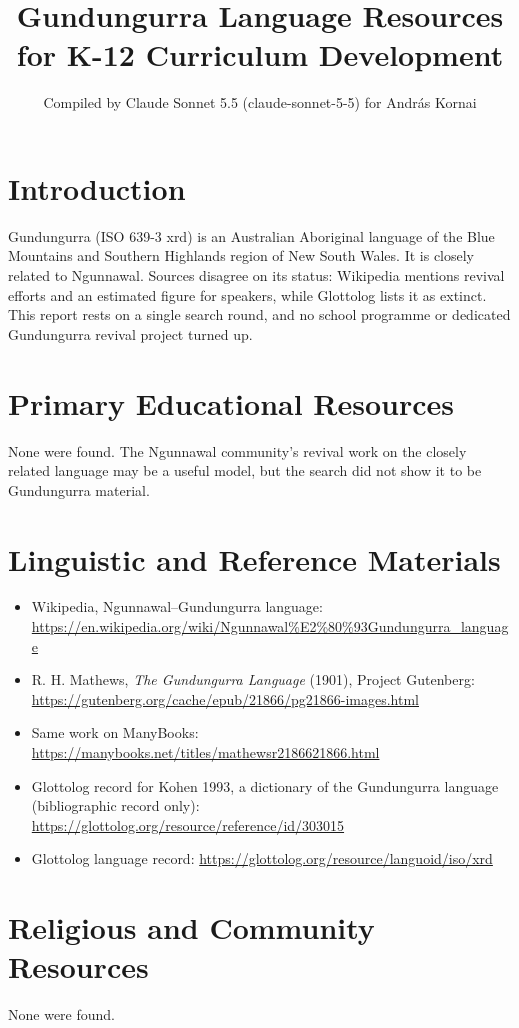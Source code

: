 \documentclass[12pt]{article}
\title{Gundungurra Language Resources for K-12 Curriculum Development}
\author{Compiled by Claude Sonnet 5.5 (claude-sonnet-5-5) for Andr\'as Kornai}
\date{}
\begin{document}
\maketitle

\section{Introduction}
Gundungurra (ISO 639-3 xrd) is an Australian Aboriginal language of the Blue Mountains and Southern Highlands region of New South Wales. It is closely related to Ngunnawal. Sources disagree on its status: Wikipedia mentions revival efforts and an estimated figure for speakers, while Glottolog lists it as extinct. This report rests on a single search round, and no school programme or dedicated Gundungurra revival project turned up.

\section{Primary Educational Resources}
None were found. The Ngunnawal community's revival work on the closely related language may be a useful model, but the search did not show it to be Gundungurra material.

\section{Linguistic and Reference Materials}
\begin{itemize}
\item Wikipedia, Ngunnawal--Gundungurra language: \url{https://en.wikipedia.org/wiki/Ngunnawal%E2%80%93Gundungurra_language}
\item R. H. Mathews, \textit{The Gundungurra Language} (1901), Project Gutenberg: \url{https://gutenberg.org/cache/epub/21866/pg21866-images.html}
\item Same work on ManyBooks: \url{https://manybooks.net/titles/mathewsr2186621866.html}
\item Glottolog record for Kohen 1993, a dictionary of the Gundungurra language (bibliographic record only): \url{https://glottolog.org/resource/reference/id/303015}
\item Glottolog language record: \url{https://glottolog.org/resource/languoid/iso/xrd}
\end{itemize}

\section{Religious and Community Resources}
None were found.
\end{document}
